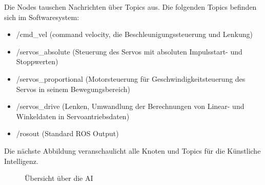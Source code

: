\documentclass[conference]{IEEEtran}
\begin{document}
	Die Nodes  tauschen Nachrichten über Topics aus.
	Die folgenden Topics befinden sich im Softwaresystem:
	\begin{itemize}
		\item /cmd\_vel (command velocity, die Beschleunigungssteuerung und 
		Lenkung)
		\item /servos\_absolute (Steuerung des Servos mit absoluten Impulsstart- und Stoppwerten)
		\item /servos\_proportional (Motorsteuerung für Geschwindigkeitsteuerung des Servos in seinem Bewegungsbereich)
		\item /servos\_drive (Lenken, Umwandlung der Berechnungen von Linear- und Winkeldaten in Servoantriebsdaten)
		\item /rosout (Standard ROS Output)
	\end{itemize}

	Die nächste Abbildung veranschaulicht alle Knoten und Topics für die 
	Künstliche Intelligenz. 

	\begin{figure}[!ht] 
		\centering
		\def\svgwidth{11cm}
		
		\caption{Übersicht über die AI}
		\label{AI-Only}
	\end{figure}
\end{document}
